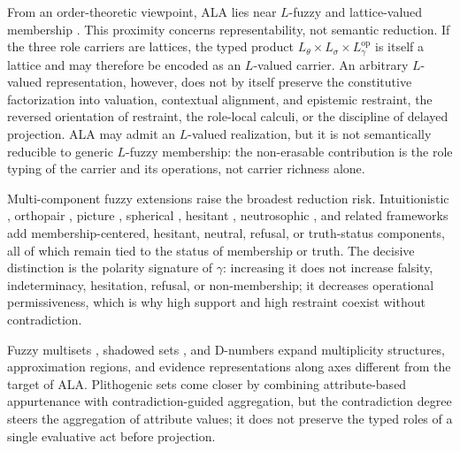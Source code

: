 \documentclass[reqno,final]{amsart}
\theoremstyle{definition}
\theoremstyle{plain}
\theoremstyle{remark}
\begin{document}
From an order-theoretic viewpoint, ALA lies near \(L\)-fuzzy and lattice-valued membership \cite{Goguen1967}. This proximity concerns representability, not semantic reduction. If the three role carriers are lattices, the typed product \(L_\theta\times L_\sigma\times L_\gamma^{\mathrm{op}}\) is itself a lattice and may therefore be encoded as an \(L\)-valued carrier. An arbitrary \(L\)-valued representation, however, does not by itself preserve the constitutive factorization into valuation, contextual alignment, and epistemic restraint, the reversed orientation of restraint, the role-local calculi, or the discipline of delayed projection. ALA may admit an \(L\)-valued realization, but it is not semantically reducible to generic \(L\)-fuzzy membership: the non-erasable contribution is the role typing of the carrier and its operations, not carrier richness alone.

Multi-component fuzzy extensions raise the broadest reduction risk. Intuitionistic \cite{Atanassov1986,DuboisEtAl2005}, orthopair \cite{Yager2014,Yager2017}, picture \cite{Cuong2014}, spherical \cite{KutluKahraman2019}, hesitant \cite{Torra2010}, neutrosophic \cite{Smarandache1998}, and related frameworks add membership-centered, hesitant, neutral, refusal, or truth-status components, all of which remain tied to the status of membership or truth. The decisive distinction is the polarity signature of \(\gamma\): increasing it does not increase falsity, indeterminacy, hesitation, refusal, or non-membership; it decreases operational permissiveness, which is why high support and high restraint coexist without contradiction.

Fuzzy multisets \cite{Yager1986Bags}, shadowed sets \cite{Pedrycz1998Shadowed}, and D-numbers \cite{Deng2012DNumbers} expand multiplicity structures, approximation regions, and evidence representations along axes different from the target of ALA. Plithogenic sets \cite{Smarandache2017Plithogenic} come closer by combining attribute-based appurtenance with contradiction-guided aggregation, but the contradiction degree steers the aggregation of attribute values; it does not preserve the typed roles of a single evaluative act before projection.
\end{document}
